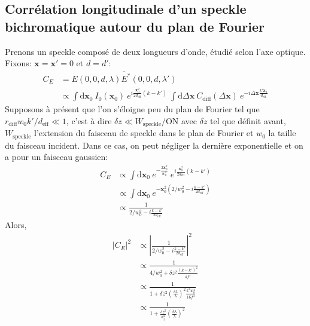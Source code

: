 \subsection{Corrélation longitudinale d'un speckle bichromatique autour du plan de Fourier}
Prenons un speckle composé de deux longueurs d'onde, étudié selon l'axe optique. Fixons: $\mathbf{x}=\mathbf{x}'=0$ et $d=d'$:
\begin{align}
C_E &= \overline{E(0,0,d,\lambda)E^*(0,0,d,\lambda')} \\
& \propto \int{\mathrm{d}\mathbf{x}_0 \: I_0(\mathbf{x}_0) \: e^{i\frac{\mathbf{x}_0^2}{2d_{\mathrm{eff}}}(k-k')} \: \int{\mathrm{d}\Delta\mathbf{x} \: C_{\mathrm{diff}}(\Delta\mathbf{x}) \: e^{-i\Delta\mathbf{x} \frac{k' \mathbf{x}_0}{d_{\mathrm{eff}}}}}}
\end{align}
Supposons à présent que l'on s'éloigne peu du plan de Fourier tel que $r_{\mathrm{diff}} w_0 k'/d_{\mathrm{eff}} \ll 1$, c'est à dire $\delta z \ll W_{\mathrm{speckle}} / \mathrm{ON}$ avec $ \delta z$ tel que définit avant, $W_{\mathrm{speckle}}$ l'extension du faisceau de speckle dans le plan de Fourier et $w_0$ la taille du faisceau incident. Dans ce cas, on peut négliger la dernière exponentielle et on a pour un faisceau gaussien:
\begin{align}
C_E &\propto \int{\mathrm{d}\mathbf{x}_0 \: e^{-\frac{2\mathbf{x}_0^2}{w_0^2}} \: e^{i\frac{\mathbf{x}_0^2}{2d_{\mathrm{eff}}}(k-k')}} \\ 
&\propto \int{\mathrm{d}\mathbf{x}_0 \: e^{-\mathbf{x}_0^2 (2/w_0^2-i\frac{k-k'}{2d_{\mathrm{eff}}})}} \\
&\propto \frac{1}{2/w_0^2-i\frac{k-k'}{2d_{\mathrm{eff}}}}
\end{align}
Alors,
\begin{align}
\left| C_E \right| ^2 &\propto \left| \frac{1}{2/w_0^2-i\frac{k-k'}{2d_{\mathrm{eff}}}} \right| ^2 \\
&\propto \frac{1}{4/w_0^2+\delta z^2 \frac{(k-k')^2}{4f^4}} \\
&\propto \frac{1}{1+\delta z^2 \left( \frac{\delta \lambda}{\lambda} \right)^2 \frac{k^2 w_0^4}{16f^4}} \\
&\propto \frac{1}{1+\frac{\delta z^2}{\sigma_{\parallel}^2} \left(\frac{\delta \lambda}{\lambda}\right)^2}
\end{align}





